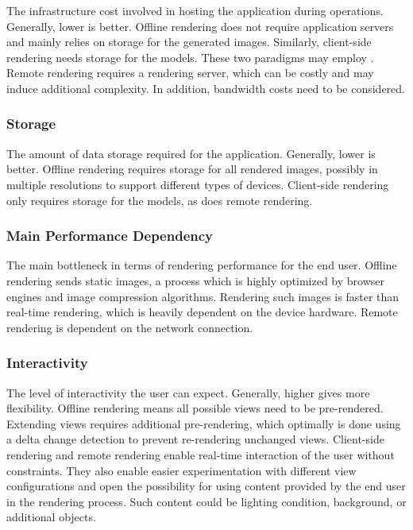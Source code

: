 The infrastructure cost involved in hosting the application during operations. Generally, lower is better. Offline rendering does not require application servers and mainly relies on storage for the generated images. Similarly, client-side rendering needs storage for the models. These two paradigms may employ . Remote rendering requires a rendering server, which can be costly and may induce additional complexity. In addition, bandwidth costs need to be considered.

\subsubsection{Storage}

The amount of data storage required for the application. Generally, lower is better. Offline rendering requires storage for all rendered images, possibly in multiple resolutions to support different types of devices. Client-side rendering only requires storage for the models, as does remote rendering.

\subsubsection{Main Performance Dependency}

The main bottleneck in terms of rendering performance for the end user. Offline rendering sends static images, a process which is highly optimized by browser engines and image compression algorithms. Rendering such images is faster than real-time rendering, which is heavily dependent on the device hardware. Remote rendering is dependent on the network connection.

\subsubsection{Interactivity}

The level of interactivity the user can expect. Generally, higher gives more flexibility. Offline rendering means all possible views need to be pre-rendered. Extending views requires additional pre-rendering, which optimally is done using a delta change detection to prevent re-rendering unchanged views. Client-side rendering and remote rendering enable real-time interaction of the user without constraints. They also enable easier experimentation with different view configurations and open the possibility for using content provided by the end user in the rendering process. Such content could be lighting condition, background, or additional objects.

